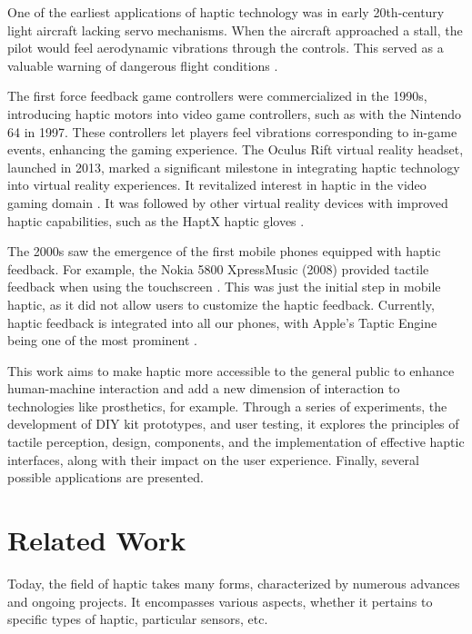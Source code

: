 One of the earliest applications of haptic technology was in early 20th-century light aircraft lacking servo mechanisms. When the aircraft approached a stall, the pilot would feel aerodynamic vibrations through the controls. This served as a valuable warning of dangerous flight conditions \cite{van_baelen_evaluation_2019}\cite{noauthor_haptic_2023}.

The first force feedback game controllers were commercialized in the 1990s, introducing haptic motors into video game controllers, such as with the Nintendo 64 in 1997. These controllers let players feel vibrations corresponding to in-game events, enhancing the gaming experience. The Oculus Rift virtual reality headset, launched in 2013, marked a significant milestone in integrating haptic technology into virtual reality experiences. It revitalized interest in haptic in the video gaming domain \cite{saddik_haptics_2012}\cite{soderstrom_haptic_2022}. It was followed by other virtual reality devices with improved haptic capabilities, such as the HaptX haptic gloves \cite{admin_haptx_2021}.



The 2000s saw the emergence of the first mobile phones equipped with haptic feedback. For example, the Nokia 5800 XpressMusic (2008) provided tactile feedback when using the touchscreen \cite{noauthor_nokia_2023}. This was just the initial step in mobile haptic, as it did not allow users to customize the haptic feedback. Currently, haptic feedback is integrated into all our phones, with Apple's Taptic Engine being one of the most prominent \cite{noauthor_good_2023}.

This work aims to make haptic more accessible to the general public to enhance human-machine interaction and add a new dimension of interaction to technologies like prosthetics, for example. Through a series of experiments, the development of DIY kit prototypes, and user testing, it explores the principles of tactile perception, design, components, and the implementation of effective haptic interfaces, along with their impact on the user experience. Finally, several possible applications are presented.

\section{Related Work}

Today, the field of haptic takes many forms, characterized by numerous advances and ongoing projects. It encompasses various aspects, whether it pertains to specific types of haptic, particular sensors, etc.

